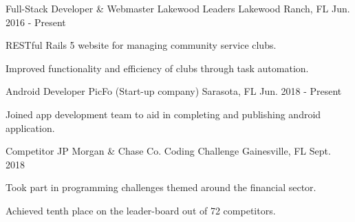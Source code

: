 \begin{cventries}
  \cventry
    {Full-Stack Developer \& Webmaster}
    {Lakewood Leaders}
    {Lakewood Ranch, FL}
    {Jun. 2016 - Present}
    {
      \begin{cvitems}
        \item {RESTful Rails 5 website for managing community service clubs.}
        \item {Improved functionality and efficiency of clubs through task automation.}
      \end{cvitems}
    }
  \cventry
    {Android Developer}
    {PicFo (Start-up company)}
    {Sarasota, FL}
    {Jun. 2018 - Present}
    {
      \begin{cvitems}
        \item {Joined app development team to aid in completing and publishing android application.}
      \end{cvitems}
    }
  \cventry
    {Competitor}
    {JP Morgan \& Chase Co. Coding Challenge}
    {Gainesville, FL}
    {Sept. 2018}
    {
      \begin{cvitems}
        \item {Took part in programming challenges themed around the financial sector.}
        \item {Achieved tenth place on the leader-board out of 72 competitors.}
      \end{cvitems}
    }
\end{cventries}
